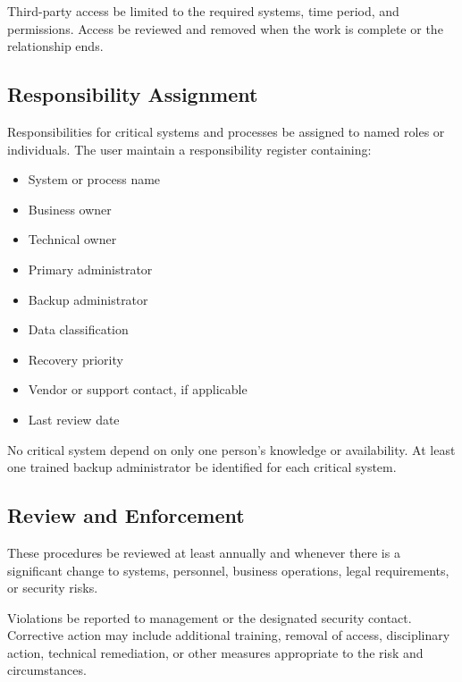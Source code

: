 Third-party access \must{} be limited to the required systems, time period, and permissions. Access \must{} be reviewed and removed when the work is complete or the relationship ends.

\subsection{Responsibility Assignment}

Responsibilities for critical systems and processes \must{} be assigned to named roles or individuals. The user \should{} maintain a responsibility register containing:
\begin{itemize}
    \item System or process name
    \item Business owner
    \item Technical owner
    \item Primary administrator
    \item Backup administrator
    \item Data classification
    \item Recovery priority
    \item Vendor or support contact, if applicable
    \item Last review date
\end{itemize}

No critical system \should{} depend on only one person's knowledge or availability. At least one trained backup administrator \should{} be identified for each critical system.

\subsection{Review and Enforcement}

These procedures \should{} be reviewed at least annually and whenever there is a significant change to systems, personnel, business operations, legal requirements, or security risks.

Violations \must{} be reported to management or the designated security contact. Corrective action may include additional training, removal of access, disciplinary action, technical remediation, or other measures appropriate to the risk and circumstances.